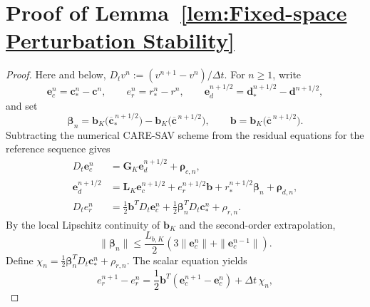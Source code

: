 \documentclass[10pt,reqno]{amsart}
\theoremstyle{remark}
\theoremstyle{definition}
\begin{document}
\section{Proof of Lemma~\ref{lem:Fixed-space Perturbation Stability}}
\label{sec:pf:lem:Fixed-space Perturbation Stability}
\begin{proof}
  Here and below, $D_t v^n:=(v^{n+1}-v^n)/\Delta t$. For $n\geq1$, write
  \begin{equation}
    \boldsymbol e_c^n=\boldsymbol c_*^n-\boldsymbol c^n,\qquad e_r^n=r_*^n-r^n,\qquad \boldsymbol e_d^{n+1/2}=\boldsymbol d_*^{n+1/2}-\boldsymbol d^{n+1/2},
  \end{equation}
  and set
  \begin{equation}
    \boldsymbol\beta_n=\boldsymbol b_K\bigl(\overline{\boldsymbol c}_*^{\,n+1/2}\bigr)-\boldsymbol b_K\bigl(\overline{\boldsymbol c}^{\,n+1/2}\bigr),
    \qquad \boldsymbol b=\boldsymbol b_K\bigl(\overline{\boldsymbol c}^{\,n+1/2}\bigr).
  \end{equation}
  Subtracting the numerical CARE-SAV scheme from the residual equations for the reference sequence gives
  \begin{equation}
    \begin{aligned}
      D_t\boldsymbol e_c^n&=\boldsymbol{G}_K\boldsymbol e_d^{n+1/2}+\boldsymbol\rho_{c,n},\\
      \boldsymbol e_d^{n+1/2}&=\boldsymbol{L}_K\boldsymbol e_c^{n+1/2}+e_r^{n+1/2}\boldsymbol b+r_*^{n+1/2}\boldsymbol\beta_n+\boldsymbol\rho_{d,n},\\
      D_te_r^n&=\frac12\boldsymbol b^{T} D_t\boldsymbol e_c^n+\frac12\boldsymbol\beta_n^{T} D_t\boldsymbol c_*^n+\rho_{r,n}.
    \end{aligned}
    \label{eq:SM fixed-space error equations}
  \end{equation}
  By the local Lipschitz continuity of $\boldsymbol b_K$ and the second-order extrapolation,
  \begin{equation}
    \|\boldsymbol\beta_n\|\leq \frac{L_{b,K}}{2}\left(3\|\boldsymbol e_c^n\|+\|\boldsymbol e_c^{n-1}\|\right).
    \label{eq:SM beta estimate}
  \end{equation}
  Define $\chi_n=\frac12\boldsymbol\beta_n^{T} D_t\boldsymbol c_*^n+\rho_{r,n}$. The scalar equation yields
  \begin{equation}
    e_r^{n+1}-e_r^n=\frac12\boldsymbol b^{T}(\boldsymbol e_c^{n+1}-\boldsymbol e_c^n)+\Delta t\,\chi_n,
    \label{eq:SM scalar recovery increment}
  \end{equation}

\end{proof}
\end{document}
